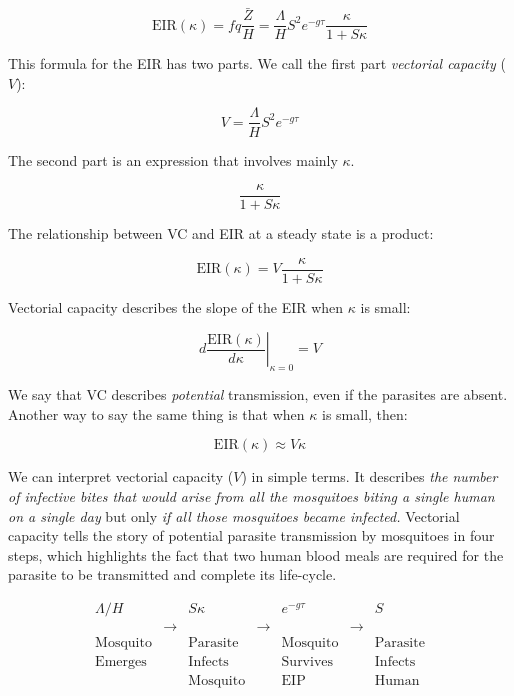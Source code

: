 \documentclass[
]{book}
\begin{document}
\begin{equation}
\mbox{EIR}(\kappa) = fq \frac{\bar Z}{H} = \frac{\Lambda}{H} S^2  e^{-g\tau} \frac{\kappa}{1 + S \kappa} 
\end{equation}

This formula for the EIR has two parts. We call the first part \emph{vectorial capacity} (\(V\)):

\begin{equation}
V = \frac{\Lambda}{H} S^2  e^{-g\tau} 
\label{eq:VCdefined}
\end{equation}

The second part is an expression that involves mainly \(\kappa\).

\begin{equation}
\frac{\kappa}{1 + S \kappa} 
\label{eq:EIR2ndpart}
\end{equation}

The relationship between VC and EIR at a steady state is a product:

\begin{equation}
\mbox{EIR}(\kappa) = V \frac{\kappa}{1 + S \kappa} 
\label{eq:EIR2VC}
\end{equation}

Vectorial capacity describes the slope of the EIR when \(\kappa\) is small:

\begin{equation}
\left. d\frac{\mbox{EIR}(\kappa)}{d\kappa}\right|_{\kappa = 0} = V
\label{eq:VCisdEIR}
\end{equation}

We say that VC describes \emph{potential} transmission, even if the parasites are absent. Another way to say the same thing is that when \(\kappa\) is small, then:

\begin{equation}
\mbox{EIR}(\kappa) \approx V \kappa
\end{equation}

We can interpret vectorial capacity (\(V\)) in simple terms. It describes \emph{the number of infective bites that would arise from all the mosquitoes biting a single human on a single day} but only \emph{if all those mosquitoes became infected.} Vectorial capacity tells the story of potential parasite transmission by mosquitoes in four steps, which highlights the fact that two human blood meals are required for the parasite to be transmitted and complete its life-cycle.

\begin{equation}
\begin{array}{|c|c|c|c|c|c|c|}
\Lambda/H &  & S \kappa &  & e^{-g\tau} & & S \\
& \rightarrow &  & \rightarrow &  & \rightarrow &  \\
\mbox{Mosquito} & & \mbox{Parasite} & & \mbox{Mosquito} && \mbox{Parasite} \\
\mbox{Emerges} & & \mbox{Infects} & & \mbox{Survives} && \mbox{Infects} \\
 & & \mbox{Mosquito} & & \mbox{EIP} && \mbox{Human}
\end{array}
\label{eq:VCstory}
\end{equation}
\end{document}
